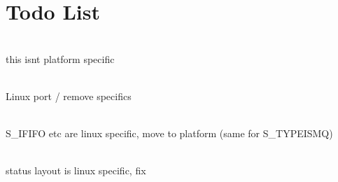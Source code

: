 \chapter{Todo List }
\hypertarget{todo}{}\label{todo}

\begin{DoxyRefList}
\item[{\parbox[t]{\linewidth}{Member \doxylink{example_8c_aa006daaf11f1e2e45a6ababaf463212b}{environ} }}]\hfill \\
\label{todo__todo000001}%
%
this isnt platform specific  
\item[{\parbox[t]{\linewidth}{File \doxylink{errno_8h}{errno.h} }}]\hfill \\
\label{todo__todo000002}%
%
Linux port / remove specifics  
\item[{\parbox[t]{\linewidth}{File \doxylink{stat_8h}{stat.h} }}]\hfill \\
\label{todo__todo000003}%
%
S\+\_\+\+IFIFO etc are linux specific, move to platform (same for S\+\_\+\+TYPEISMQ)  
\item[{\parbox[t]{\linewidth}{File \doxylink{wait_8h}{wait.h} }}]\hfill \\
\label{todo__todo000004}%
%
status layout is linux specific, fix 
\end{DoxyRefList}